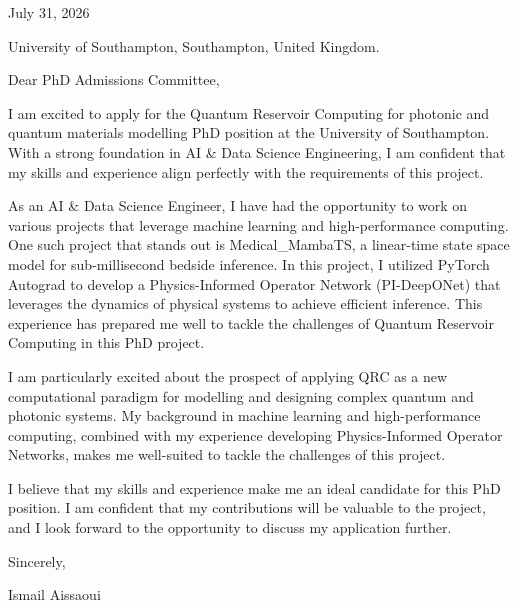 \documentclass{letter}
\begin{document}
\opening{July 31, 2026}

University of Southampton,
Southampton, United Kingdom.

Dear PhD Admissions Committee,

I am excited to apply for the Quantum Reservoir Computing for photonic and quantum materials modelling PhD position at the University of Southampton. With a strong foundation in AI & Data Science Engineering, I am confident that my skills and experience align perfectly with the requirements of this project.

As an AI & Data Science Engineer, I have had the opportunity to work on various projects that leverage machine learning and high-performance computing. One such project that stands out is Medical_MambaTS, a linear-time state space model for sub-millisecond bedside inference. In this project, I utilized PyTorch Autograd to develop a Physics-Informed Operator Network (PI-DeepONet) that leverages the dynamics of physical systems to achieve efficient inference. This experience has prepared me well to tackle the challenges of Quantum Reservoir Computing in this PhD project.

I am particularly excited about the prospect of applying QRC as a new computational paradigm for modelling and designing complex quantum and photonic systems. My background in machine learning and high-performance computing, combined with my experience developing Physics-Informed Operator Networks, makes me well-suited to tackle the challenges of this project.

I believe that my skills and experience make me an ideal candidate for this PhD position. I am confident that my contributions will be valuable to the project, and I look forward to the opportunity to discuss my application further.

Sincerely,

Ismail Aissaoui

\closing{}
\end{document}
